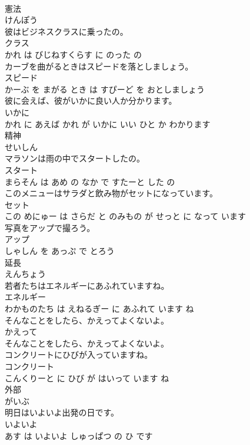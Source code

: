 \documentclass[8pt]{extreport}
\begin{document}
\begin{CJK}{UTF8}{min}
\\	憲法	
\\	けんぽう		
\\	彼はビジネスクラスに乗ったの。	
\\	クラス 
\\	かれ は びじねすくらす に のった の		
\\	カーブを曲がるときはスピードを落としましょう。	
\\	スピード 
\\	かーぶ を まがる とき は すぴーど を おとしましょう		
\\	彼に会えば、彼がいかに良い人か分かります。	
\\	いかに 
\\	かれ に あえば かれ が いかに いい ひと か わかります		
\\	精神	
\\	せいしん		
\\	マラソンは雨の中でスタートしたの。	
\\	スタート 
\\	まらそん は あめ の なか で すたーと した の		
\\	このメニューはサラダと飲み物がセットになっています。	
\\	セット 
\\	この めにゅー は さらだ と のみもの が せっと に なって います		
\\	写真をアップで撮ろう。	
\\	アップ 
\\	しゃしん を あっぷ で とろう		
\\	延長	
\\	えんちょう		
\\	若者たちはエネルギーにあふれていますね。	
\\	エネルギー 
\\	わかものたち は えねるぎー に あふれて います ね		
\\	そんなことをしたら、かえってよくないよ。	
\\	かえって 
\\	そんなことをしたら、かえってよくないよ。		
\\	コンクリートにひびが入っていますね。	
\\	コンクリート 
\\	こんくりーと に ひび が はいって います ね		
\\	外部	
\\	がいぶ		
\\	明日はいよいよ出発の日です。	
\\	いよいよ 
\\	あす は いよいよ しゅっぱつ の ひ です		

\end{CJK}
\end{document}
